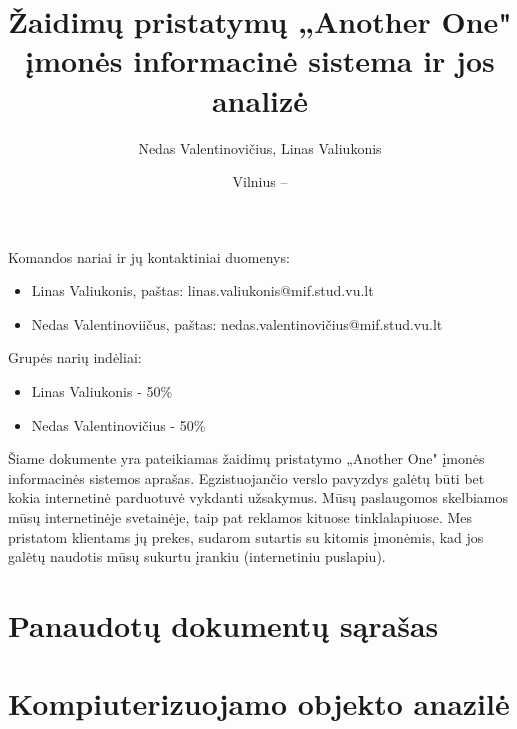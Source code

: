 \documentclass{VUMIFPSkursinis}
\title{Žaidimų pristatymų „Another One" įmonės informacinė sistema ir jos analizė}
\author{Nedas Valentinovičius, Linas Valiukonis}
\date{Vilnius – \the\year}
\begin{document}
	
\maketitle
\cleardoublepage{}
\setcounter{page}{2}

Komandos nariai ir jų kontaktiniai duomenys:
\begin{itemize}
	\item Linas Valiukonis, paštas: linas.valiukonis@mif.stud.vu.lt
	\item Nedas Valentinoviičus, paštas: nedas.valentinovičius@mif.stud.vu.lt
\end{itemize}
Grupės narių indėliai:
\begin {itemize}
	\item Linas Valiukonis - 50\%
	\item Nedas Valentinovičius - 50\%
\end{itemize}

\tableofcontents

Šiame dokumente yra pateikiamas žaidimų pristatymo „Another One" įmonės informacinės sistemos aprašas. Egzistuojančio verslo pavyzdys galėtų būti bet kokia internetinė parduotuvė vykdanti užsakymus. Mūsų paslaugomos skelbiamos mūsų internetinėje svetainėje, taip pat reklamos kituose tinklalapiuose. Mes pristatom klientams jų prekes, sudarom sutartis su kitomis įmonėmis, kad jos galėtų naudotis mūsų sukurtu įrankiu (internetiniu puslapiu).

\section{Panaudotų dokumentų sąrašas}



\newpage
\section{Kompiuterizuojamo objekto anazilė}

\newpage
\end{document}
